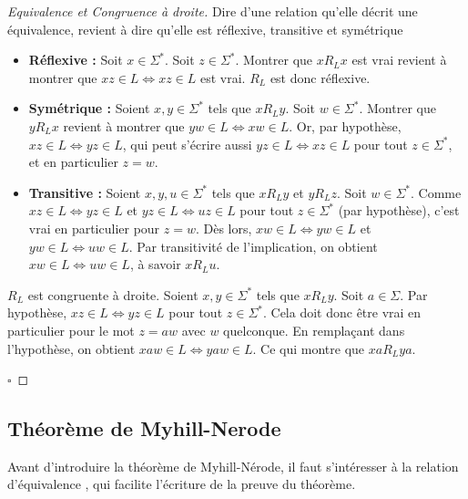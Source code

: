 \begin{proof}[Equivalence et Congruence à droite]
	Dire d'une relation qu'elle décrit une équivalence, revient à dire qu'elle est réflexive, transitive et symétrique
\begin{itemize}
		\item\textbf{Réflexive :} Soit $x \in \Sigma^*$. Soit $z \in \Sigma^*$. Montrer que $xR_Lx$ est vrai revient à montrer que $ xz \in L \Leftrightarrow xz \in L$ est vrai. $R_L$ est donc réflexive.
		\item \textbf{Symétrique :} Soient $x, y \in \Sigma^*$ tels que $xR_Ly$. Soit $w \in \Sigma^*$. Montrer que $yR_Lx$ revient à montrer que $ yw \in L \Leftrightarrow xw \in L$. Or, par hypothèse, $ xz \in L \Leftrightarrow yz \in L$, qui peut s'écrire aussi $ yz \in L \Leftrightarrow xz \in L$ pour tout $z \in \Sigma^*$, et en particulier $z=w$.
		\item \textbf{Transitive :} Soient $x,y,u \in \Sigma^*$ tels que $xR_Ly$ et $yR_Lz$. Soit $w \in \Sigma^*$. Comme $ xz \in L \Leftrightarrow yz \in L$ et $ yz \in L \Leftrightarrow uz \in L$ pour tout $z \in \Sigma^*$ (par hypothèse), c'est vrai en particulier pour $z=w$. Dès lors,  $ xw \in L \Leftrightarrow yw \in L$ et $ yw \in L \Leftrightarrow uw \in L$. Par transitivité de l'implication, on obtient $ xw \in L \Leftrightarrow uw \in L$, à savoir $xR_Lu$.
	\end{itemize}

	$R_L$ est congruente à droite. Soient $x,y \in \Sigma^*$ tels que $xR_Ly$. Soit $a \in \Sigma$. Par hypothèse, $ xz \in L \Leftrightarrow yz \in L$ pour tout $z \in \Sigma^*$. Cela doit donc être vrai en particulier pour le mot $z=aw$ avec $w$ quelconque. En remplaçant dans l'hypothèse, on obtient  $ xaw \in L \Leftrightarrow yaw \in L$. Ce qui montre que $xaR_Lya$.

\hfill$\square$
\end{proof}


\subsection{Théorème de Myhill-Nerode}

	Avant d'introduire la théorème de Myhill-Nérode, il faut s'intéresser à la relation d'équivalence \rb, qui facilite l'écriture de la preuve du théorème.

